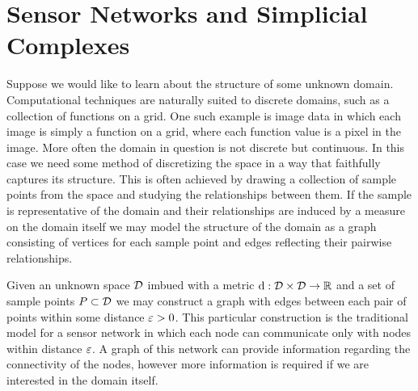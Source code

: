 \section{Sensor Networks and Simplicial Complexes} %
\label{sec:complexes}

Suppose we would like to learn about the structure of some unknown domain.
Computational techniques are naturally suited to discrete domains, such as a collection of functions on a grid.
One such example is image data in which each image is simply a function on a grid, where each function value is a pixel in the image.
More often the domain in question is not discrete but continuous.
In this case we need some method of discretizing the space in a way that faithfully captures its structure.
This is often achieved by drawing a collection of sample points from the space and studying the relationships between them.
If the sample is representative of the domain and their relationships are induced by a measure on the domain itself we may model the structure of the domain as a graph consisting of vertices for each sample point and edges reflecting their pairwise relationships.

Given an unknown space ${\mathcal{D}}$ imbued with a metric $\mathrm{d}:{\mathcal{D}}\times{\mathcal{D}}\to\mathbb{R}$ and a set of sample points $P\subset{\mathcal{D}}$ we may construct a graph with edges between each pair of points within some distance $\varepsilon > 0$.
This particular construction is the traditional model for a sensor network in which each node can communicate only with nodes within distance $\varepsilon$.
A graph of this network can provide information regarding the connectivity of the nodes, however more information is required if we are interested in the domain itself.


